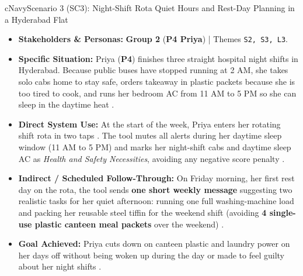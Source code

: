 \documentclass[12pt, a4paper]{article}
\begin{document}
\begin{scenariocard}{cNavy}{Scenario 3 (SC3): Night-Shift Rota Quiet Hours and Rest-Day Planning in a Hyderabad Flat}
\footnotesize
\begin{itemize}
    \item \textbf{Stakeholders \& Personas:} \textbf{Group 2} (\textbf{P4 Priya}) | Themes \texttt{S2, S3, L3}.
    \item \textbf{Specific Situation:} Priya (\textbf{P4}) finishes three straight hospital night shifts in Hyderabad. Because public buses have stopped running at 2 AM, she takes solo cabs home to stay safe, orders takeaway in plastic packets because she is too tired to cook, and runs her bedroom AC from 11 AM to 5 PM so she can sleep in the daytime heat \cite{cf9}.
    \item \textbf{Direct System Use:} At the start of the week, Priya enters her rotating shift rota in two taps \cite{cf9}. The tool mutes all alerts during her daytime sleep window (11 AM to 5 PM) and marks her night-shift cabs and daytime sleep AC as \textit{Health and Safety Necessities}, avoiding any negative score penalty \cite{cf5, cf9}.
    \item \textbf{Indirect / Scheduled Follow-Through:} On Friday morning, her first rest day on the rota, the tool sends \textbf{one short weekly message} suggesting two realistic tasks for her quiet afternoon: running one full washing-machine load and packing her reusable steel tiffin for the weekend shift (avoiding \textbf{4 single-use plastic canteen meal packets} over the weekend) \cite{cf9}.
    \item \textbf{Goal Achieved:} Priya cuts down on canteen plastic and laundry power on her days off without being woken up during the day or made to feel guilty about her night shifts \cite{cf9}.
\end{itemize}
\end{scenariocard}
\end{document}
